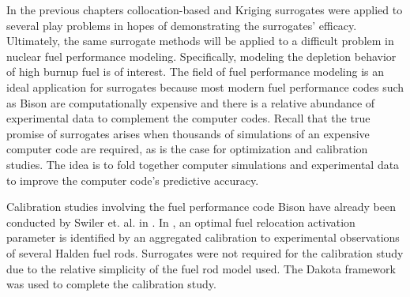 In the previous chapters collocation-based and Kriging surrogates were applied to several play problems in hopes of demonstrating the surrogates' efficacy. Ultimately, the same surrogate methods will be applied to a difficult problem in nuclear fuel performance modeling. Specifically, modeling the depletion behavior of high burnup fuel is of interest. The field of fuel performance modeling is an ideal application for surrogates because most modern fuel performance codes such as Bison \cite{Williamson} are computationally expensive and there is a relative abundance of experimental data to complement the computer codes. Recall that the true promise of surrogates arises when thousands of simulations of an expensive computer code are required, as is the case for optimization and calibration studies. The idea is to fold together computer simulations and experimental data to improve the computer code's predictive accuracy.    

Calibration studies involving the fuel performance code Bison have already been conducted by Swiler et. al. in \cite{Swiler2}. In \cite{Swiler2}, an optimal fuel relocation activation parameter is identified by an aggregated calibration to experimental observations of several Halden fuel rods. Surrogates were not required for the calibration study due to the relative simplicity of the fuel rod model used. The Dakota \cite{dakota} framework was used to complete the calibration study.       

